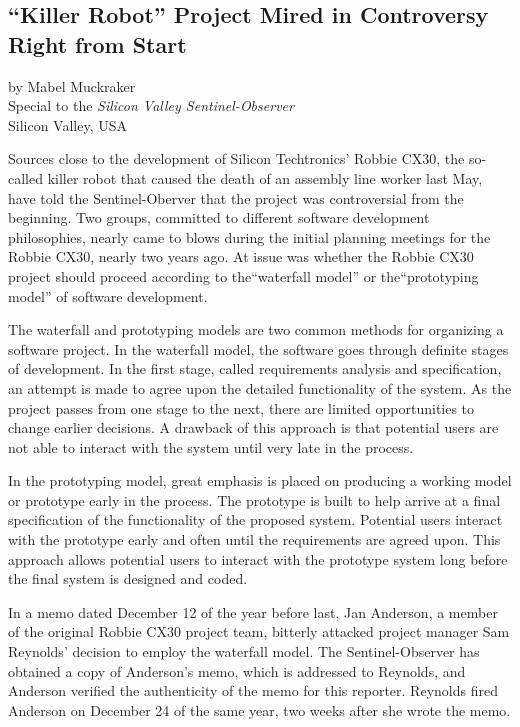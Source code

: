 \begin{center}
\section*{``Killer Robot'' Project Mired in Controversy Right from Start}
by Mabel Muckraker\\
Special to the \textit{Silicon Valley Sentinel-Observer}\\
Silicon Valley, USA
\end{center}

Sources close to the development of Silicon Techtronics' Robbie CX30, the so-called killer robot that caused the death of an assembly line worker last May, have told the Sentinel-Oberver that the project was controversial from the beginning. Two groups, committed to different software development philosophies, nearly came to blows during the initial planning meetings for the Robbie CX30, nearly two years ago. At issue was whether the Robbie CX30 project should proceed according to the``waterfall model'' or the``prototyping model'' of software development.

The waterfall and prototyping models are two common methods for organizing a software project. In the waterfall model, the software goes through definite stages of development. In the first stage, called requirements analysis and specification, an attempt is made to agree upon the detailed functionality of the system. As the project passes from one stage to the next, there are limited opportunities to change earlier decisions. A drawback of this approach is that potential users are not able to interact with the system until very late in the process.

In the prototyping model, great emphasis is placed on producing a working model or prototype early in the process. The prototype is built to help arrive at a final specification of the functionality of the proposed system. Potential users interact with the prototype early and often until the requirements are agreed upon. This approach allows potential users to interact with the prototype system long before the final system is designed and coded.

In a memo dated December 12 of the year before last, Jan Anderson, a member of the original Robbie CX30 project team, bitterly attacked project manager Sam Reynolds' decision to employ the waterfall model. The Sentinel-Observer has obtained a copy of Anderson's memo, which is addressed to Reynolds, and Anderson verified the authenticity of the memo for this reporter. Reynolds fired Anderson on December 24 of the same year, two weeks after she wrote the memo.

